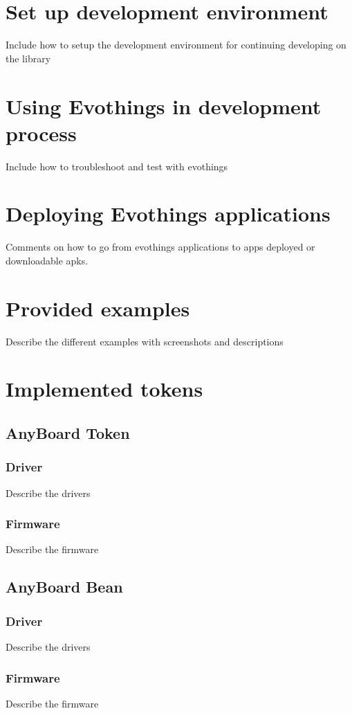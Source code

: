 \chapter{Set up development environment} \label{appendix:devsetup}
Include how to setup the development environment for continuing developing on the library
\newpage
\chapter{Using Evothings in development process} \label{appendix:evothings}
Include how to troubleshoot and test with evothings
\newpage
\chapter{Deploying Evothings applications}
Comments on how to go from evothings applications to apps deployed or downloadable apks.
\newpage

\chapter{Provided examples} \label{appendix:examples}
Describe the different examples with screenshots and descriptions
\newpage
\chapter{Implemented tokens} \label{appendix:tokens}
\section{AnyBoard Token} \label{appendix:anyboard_token}
\subsection{Driver}
Describe the drivers
\subsection{Firmware}
Describe the firmware

\newpage
\section{AnyBoard Bean} \label{appendix:anyboard_bean}
\subsection{Driver}
Describe the drivers
\subsection{Firmware}
Describe the firmware
\newpage
